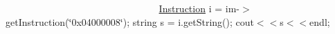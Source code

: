 ~\newline
~\newline
~\newline
~\newline
~\newline
~\newline
~\newline
~\newline
~\newline
~\newline
~\newline
~\newline
~\newline
~\newline
~\newline
~\newline
~\newline
~\newline
~\newline
 \mbox{\hyperlink{class_instruction}{Instruction}} i = im-\/$>$get\+Instruction(\char`\"{}0x04000008\char`\"{}); string s = i.\+get\+String(); cout$<$$<$s$<$$<$endl; ~\newline
~\newline
~\newline
~\newline
~\newline
~\newline
~\newline
~\newline
~\newline
~\newline
~\newline
~\newline
~\newline
~\newline
~\newline
~\newline
~\newline
~\newline
~\newline
~\newline
~\newline
~\newline
~\newline
~\newline
~\newline
~\newline
~\newline
~\newline
~\newline
~\newline

